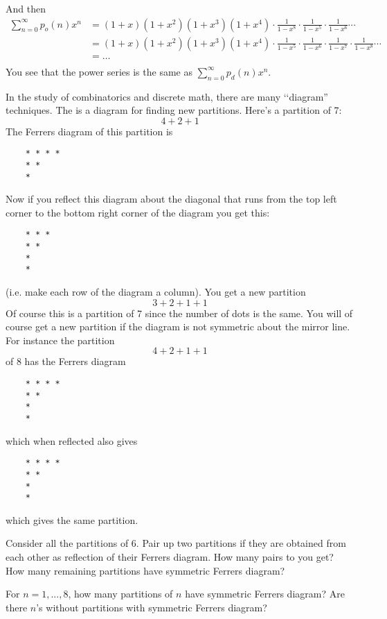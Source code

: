 And then
\begin{align*}
\sum_{n=0}^\infty p_o(n) x^n 
&= (1+x)(1+x^2)(1+x^3)(1+x^4) \cdot \frac{1}{1 - x^8} \cdot \frac{1}{1 - x^5} \cdot \frac{1}{1 - x^6} \cdots \\
&= (1+x)(1+x^2)(1+x^3)(1+x^4) \cdot \frac{1}{1 - x^5} \cdot 
\frac{1}{1 - x^6} \cdot \frac{1}{1 - x^7} \cdot \frac{1}{1 - x^8} \cdots \\
&= \ldots \\
\end{align*}
You see that the power series is the same as $\sum_{n=0}^\infty p_d(n) x^n$.

In the study of combinatorics and discrete math, 
there are many \lq\lq diagram'' techniques.
The  is a diagram for finding new partitions.
Here's a partition of 7:
\[
4 + 2 + 1
\]
The Ferrers diagram of this partition is
\begin{verbatim}
    * * * *
    * * 
    *
\end{verbatim}
Now if you reflect this diagram about the diagonal
that runs from the top left corner
to the bottom right corner of the diagram 
you get this:
\begin{verbatim}
    * * * 
    * * 
    *
    *
\end{verbatim}
(i.e. make each row of the diagram a column).
You get a new partition
\[
3 + 2 + 1 + 1
\]
Of course this is a partition of 7 since the number of dots
is the same.
You will of course get a new partition if the diagram 
is not symmetric about the mirror line.
For instance the partition
\[
4 + 2 + 1 + 1
\]
of 8 has the Ferrers diagram
\begin{verbatim}
    * * * *
    * *
    *
    *
\end{verbatim}
which when reflected also gives
\begin{verbatim}
    * * * *
    * *
    *
    *
\end{verbatim}
which gives the same partition.


\newpage
\begin{ex}
Consider all the partitions of $6$.
Pair up two partitions if they are obtained from each other
as reflection of their Ferrers diagram.
How many pairs to you get?
How many remaining partitions have symmetric Ferrers diagram?
\end{ex}


\newpage
\begin{ex}
For $n=1, ..., 8$, how many partitions of $n$ have
symmetric Ferrers diagram?
Are there $n$'s without partitions with symmetric Ferrers diagram?
\end{ex}


